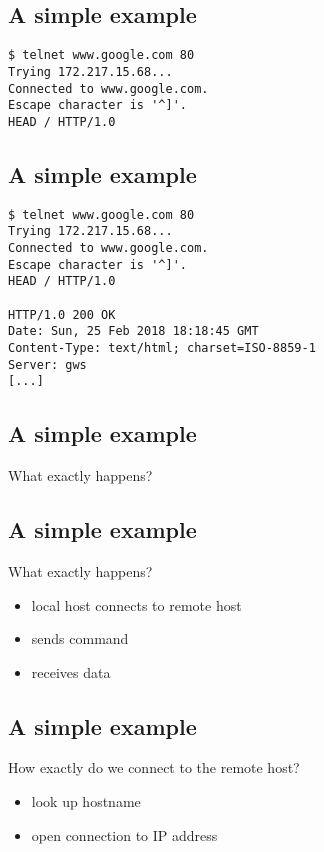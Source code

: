 \documentclass[xga]{xdvislides}
\begin{document}
\subsection{A simple example}
\Hugesize
\begin{center}
\begin{verbatim}
$ telnet www.google.com 80
Trying 172.217.15.68...
Connected to www.google.com.
Escape character is '^]'.
HEAD / HTTP/1.0

\end{verbatim}
\end{center}
\Normalsize
\vspace*{\fill}

\subsection{A simple example}
\Hugesize
\begin{center}
\begin{verbatim}
$ telnet www.google.com 80
Trying 172.217.15.68...
Connected to www.google.com.
Escape character is '^]'.
HEAD / HTTP/1.0

HTTP/1.0 200 OK
Date: Sun, 25 Feb 2018 18:18:45 GMT
Content-Type: text/html; charset=ISO-8859-1
Server: gws
[...]
\end{verbatim}
\end{center}
\Normalsize
\vspace*{\fill}

\subsection{A simple example}
What exactly happens?

\subsection{A simple example}
What exactly happens?
\\
\begin{itemize}
	\item local host connects to remote host
	\item sends command
	\item receives data
\end{itemize}

\subsection{A simple example}
How exactly do we connect to the remote host?
\\
\begin{itemize}
	\item look up hostname
	\item open connection to IP address
\end{itemize}
\end{document}
